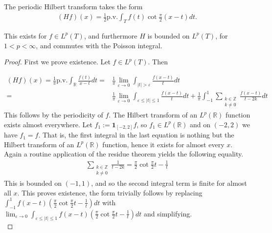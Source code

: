 \documentclass[10pt,a4paper]{amsart}
\newcommand{\R}{\mathbb{R}}
\newcommand{\Z}{\mathbb{Z}}
\newcommand{\eps}{\varepsilon}
\begin{document}
\begin{lemma}\label{lemma:2}
    The periodic Hilbert transform takes the form
    \begin{align*}
        (Hf)(x) = \frac{1}{2} \mathrm{p.v.}\int_T f(t) \cot \frac{\pi}{2} (x-t)dt.
    \end{align*}
    
    This exists for $f\in L^p(T)$, and furthermore $H$ is bounded on $L^p(T)$, for $1<p<\infty$, and commutes with the Poisson integral. 
\end{lemma}

\begin{proof}
 First we prove existence. Let $f\in L^p(T)$. Then
 
    \begin{align*}
        (H f)(x) = \frac{1}{\pi} \mathrm{p.v.} \int_\R \frac{f(t)}{x-t} dt =& \frac{1}{\pi} 
	    \lim_{\eps\to 0}\int_{|t| > \eps} \frac{f(x-t)}{t}dt \\                                         
	    =& \frac{1}{\pi} \lim_{\eps\to 0} \int_{\eps \leq |t| \leq 1} \frac{f(x-t)}{t}dt +
	\frac{1}{\pi}\int_{-1}^1 \sum_{\substack{k\in\Z\\k\neq0}}\frac{f(x-t)}{t-2k}dt 
    \end{align*}
    This follows by the periodicity of $f$. The Hilbert transform of an
    $L^p(\R)$ function exists almost everywhere. Let $f_1 :=
    \mathbf{1}_{[-2, 2]} f$, so $f_1\in L^p(\R)$ and on $(-2, 2)$ we have
    $f_1 = f$. That is, the first integral in the last equation is
    nothing but the Hilbert transform of an $L^p(\R)$ function, hence it exists
    for almost every $x$. 
    Again a routine application of the residue theorem yields the following equality.
    \begin{align*}
        \sum_{\substack{k\in\Z\\k\neq0}} \frac{1}{t-2k} = \frac{\pi}{2}
	    \cot \frac{\pi}{2}t - \frac{1}{t}
    \end{align*}
    This is bounded on $(-1, 1)$, and so the second integral term is finite for
    almost all $x$. This proves existence, the form trivially follows by
    replacing $\int_{-1}^1 f(x-t) \left(\frac{\pi}{2}\cot \frac{\pi}{2}t
    - \frac{1}{t}\right)dt$ with 
    $\lim_{\eps\to 0} \int_{\eps \leq |t| \leq 1}  f(x-t) 
	\left(\frac{\pi}{2}\cot \frac{\pi}{2}t - \frac{1}{t}\right)dt$ and simplifying.\\
    

\end{proof}
\end{document}
